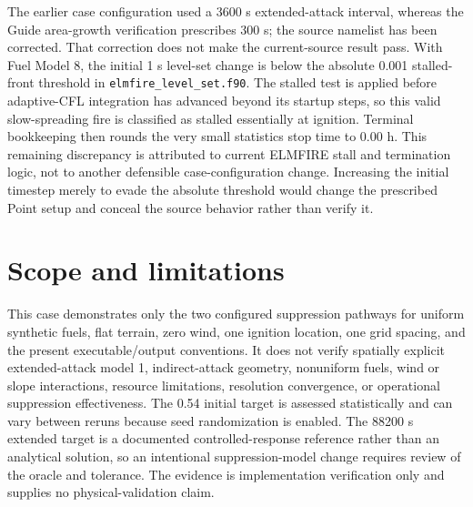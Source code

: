 The earlier case configuration used a 3600 s extended-attack interval, whereas the Guide area-growth verification prescribes 300 s; the source namelist has been corrected. That correction does not make the current-source result pass. With Fuel Model 8, the initial 1 s level-set change is below the absolute 0.001 stalled-front threshold in \texttt{elmfire\_level\_set.f90}. The stalled test is applied before adaptive-CFL integration has advanced beyond its startup steps, so this valid slow-spreading fire is classified as stalled essentially at ignition. Terminal bookkeeping then rounds the very small statistics stop time to 0.00 h. This remaining discrepancy is attributed to current ELMFIRE stall and termination logic, not to another defensible case-configuration change. Increasing the initial timestep merely to evade the absolute threshold would change the prescribed Point setup and conceal the source behavior rather than verify it.

\section{Scope and limitations}

This case demonstrates only the two configured suppression pathways for uniform synthetic fuels, flat terrain, zero wind, one ignition location, one grid spacing, and the present executable/output conventions. It does not verify spatially explicit extended-attack model 1, indirect-attack geometry, nonuniform fuels, wind or slope interactions, resource limitations, resolution convergence, or operational suppression effectiveness. The 0.54 initial target is assessed statistically and can vary between reruns because seed randomization is enabled. The 88200 s extended target is a documented controlled-response reference rather than an analytical solution, so an intentional suppression-model change requires review of the oracle and tolerance. The evidence is implementation verification only and supplies no physical-validation claim.
